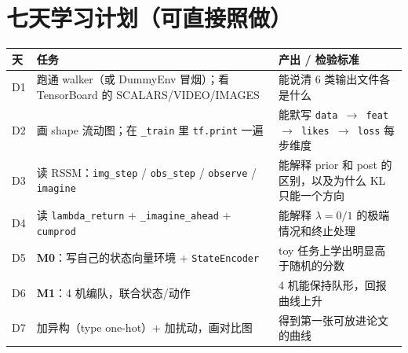 \documentclass[11pt]{ctexart}
\begin{document}
\section{七天学习计划（可直接照做）}
\begin{tabularx}{\textwidth}{l L L}
\toprule
\textbf{天} & \textbf{任务} & \textbf{产出 / 检验标准} \\
\midrule
D1 & 跑通 walker（或 DummyEnv 冒烟）；看 TensorBoard 的 SCALARS/VIDEO/IMAGES & 能说清 6 类输出文件各是什么 \\
\addlinespace
D2 & 画 shape 流动图；在 \texttt{\_train} 里 \texttt{tf.print} 一遍 & 能默写 \texttt{data $\rightarrow$ feat $\rightarrow$ likes $\rightarrow$ loss} 每步维度 \\
\addlinespace
D3 & 读 RSSM：\texttt{img\_step} / \texttt{obs\_step} / \texttt{observe} / \texttt{imagine} & 能解释 prior 和 post 的区别，以及为什么 KL 只能一个方向 \\
\addlinespace
D4 & 读 \texttt{lambda\_return} + \texttt{\_imagine\_ahead} + \texttt{cumprod} & 能解释 $\lambda=0/1$ 的极端情况和终止处理 \\
\addlinespace
D5 & \textbf{M0}：写自己的状态向量环境 + \texttt{StateEncoder} & toy 任务上学出明显高于随机的分数 \\
\addlinespace
D6 & \textbf{M1}：4 机编队，联合状态/动作 & 4 机能保持队形，回报曲线上升 \\
\addlinespace
D7 & 加异构（type one-hot）+ 加扰动，画对比图 & 得到第一张可放进论文的曲线 \\
\bottomrule
\end{tabularx}

\end{document}
